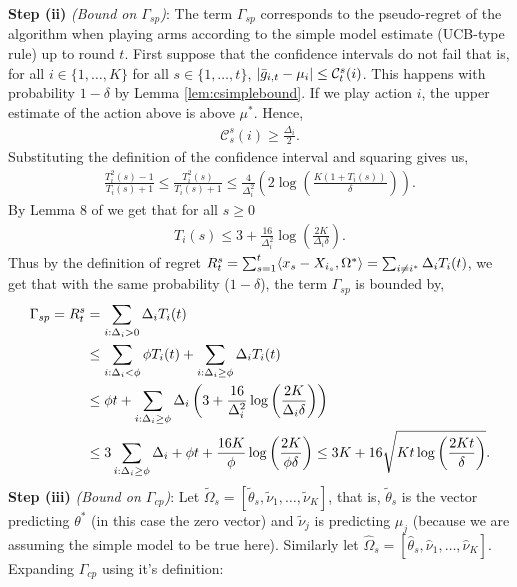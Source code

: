 \begin{Proof}
\textbf{Step (ii)} \emph{(Bound on $\Gamma_{sp}$)}:
The term $\Gamma_{sp}$ corresponds to the pseudo-regret of the algorithm when playing arms according to the simple model estimate (UCB-type rule) up to round $t$. First suppose that the confidence intervals do not fail that is, for all $i \in \{1,\ldots,K\}$ for all $s\in \{1,\ldots,t\}$, $\lvert \bar{g}_{i,t} - \mu_i \rvert \le \mathcal{C}_t^s(i)$. This happens with probability $1-\delta$ by Lemma \ref{lem:csimplebound}. If we play action $i$, the upper estimate of the action above is above $\mu^*$. Hence,
\begin{align*}
    \mathcal{C}_s^s(i) \ge \frac{\Delta_i}{2}.
\end{align*}
Substituting the definition of the confidence interval and squaring gives us, 
\begin{align*}
    \frac{T_i^2(s)-1}{T_i(s)+1} \le \frac{T_i^2(s)}{T_i(s)+1} \le \frac{4}{\Delta_i^2} \left(2\log\left( \frac{K(1+T_i(s))}{\delta}\right) \right).
\end{align*}
By Lemma 8 of \citep{antos2010active} we get that for all $s\ge 0$
\begin{align*}
    T_i(s) \le 3 + \frac{16}{\Delta_i^2} \log\left( \frac{2K}{\Delta_i \delta}\right).
\end{align*}
Thus by the definition of regret $R^s_{t} = \sum_{s=1}^t \langle x_s - X_{i_s},\Omega^*\rangle  = \sum_{i\neq i^*} \Delta_i T_{i}(t)$, we get that with the same probability ($1-\delta$), the term $\Gamma_{sp}$ is bounded by,
\begin{align*}
    \Gamma_{sp} = R^s_{t} & = \sum_{i:\Delta_i > 0 } \Delta_i T_{i}(t) \\
    & \le \sum_{i : \Delta_i < \phi} \phi T_{i}(t) + \sum_{i:\Delta_i \ge \phi} \Delta_i T_{i}(t) \\
    & \le \phi t + \sum_{i: \Delta_i \ge \phi}\Delta_i \left( 3 + \frac{16}{\Delta^2_i} \log\left(\frac{2K}{\Delta_i \delta}\right)\right)\\
    & \le 3\sum_{i:\Delta_i \ge \phi}\Delta_i + \phi t + \frac{16K}{\phi} \log\left(\frac{2K}{\phi \delta}\right) \le 3K + 16\sqrt{Kt\log\left(\frac{2Kt}{\delta}\right)}.
\end{align*}
\textbf{Step (iii)} \emph{(Bound on $\Gamma_{cp}$)}:
Let $\tilde{\Omega}_s = [\tilde{\theta}_s, \tilde{\nu}_1,\ldots, \tilde{\nu}_K]$, that is, $\tilde{\theta}_s$ is the vector predicting $\theta^*$ (in this case the zero vector) and $\tilde{\nu}_j$ is predicting $\mu_j$ (because we are assuming the simple model to be true here). Similarly let  $\hat{\Omega}_s = [\hat{\theta}_s, \hat{\nu}_1,\ldots, \hat{\nu}_K]$. Expanding $\Gamma_{cp}$ using it's definition:

\end{Proof}
